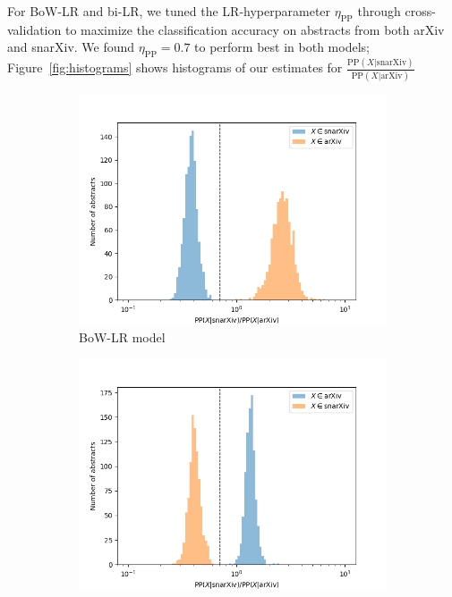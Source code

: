 \documentclass{article}
\begin{document}
For BoW-LR and bi-LR, we tuned the LR-hyperparameter $\eta_\text{PP}$ through cross-validation to maximize the classification accuracy on abstracts from both arXiv and snarXiv.
We found $\eta_{\text{PP}}=0.7$ to perform best in both models; Figure~\ref{fig:histograms} shows histograms of our estimates for $\frac{\text{PP}(X|\text{snarXiv})}{\text{PP}(X|\text{arXiv})}$ 









\begin{figure}[!htbp] 
\centering
\begin{subfigure}[t]{0.48\textwidth}
  \includegraphics[width=\textwidth]{../figures/BOW_histogram.png}
  \caption{BoW-LR model}
\end{subfigure}
  \hfill
\begin{subfigure}[t]{0.48\textwidth}
  \includegraphics[width=\textwidth]{../figures/bigram_histogram.png}

\end{subfigure}
\end{figure}
\end{document}
